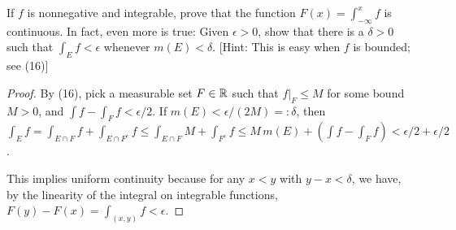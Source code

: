 \documentclass{article}
\begin{document}
 If $f$ is nonnegative and integrable, prove that the function $F(x) = \int_{-\infty}^x f$ is continuous. In fact, even more is true: Given $\epsilon > 0$, show that there is a $\delta > 0$ such that $\int_E f < \epsilon$ whenever $m(E) < \delta$. [Hint: This is easy when $f$ is bounded; see (16)]
\begin{proof}
By (16), pick a measurable set $F \in \mathbb{R}$ such that $f |_F \le M$ for some bound $M > 0$, and $\int f - \int_F f < \epsilon/2$.
If $m(E) < \epsilon/(2M) =: \delta$, then $\int_E f = \int_{E \cap F} f + \int_{E \cap F^c} f \le \int_{E \cap F} M + \int_{F^c} f \le M \, m(E) + (\int f - \int_F f) < \epsilon/2 + \epsilon/2$.

This implies uniform continuity because for any $x<y$ with $y-x < \delta$, we have, by the linearity of the integral on integrable functions, $F(y) - F(x) = \int_{(x,y)} f < \epsilon$.

\end{proof}
\end{document}
